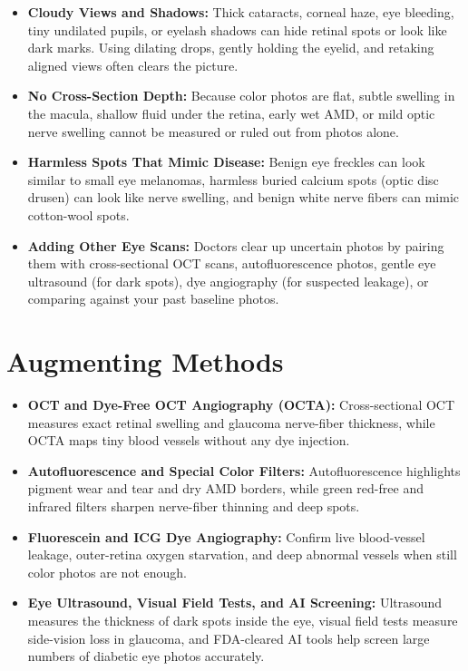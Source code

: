 \begin{itemize}
    \item \textbf{Cloudy Views and Shadows:} Thick cataracts, corneal haze, eye bleeding, tiny undilated pupils, or eyelash shadows can hide retinal spots or look like dark marks. Using dilating drops, gently holding the eyelid, and retaking aligned views often clears the picture.
    \item \textbf{No Cross-Section Depth:} Because color photos are flat, subtle swelling in the macula, shallow fluid under the retina, early wet AMD, or mild optic nerve swelling cannot be measured or ruled out from photos alone.
    \item \textbf{Harmless Spots That Mimic Disease:} Benign eye freckles can look similar to small eye melanomas, harmless buried calcium spots (optic disc drusen) can look like nerve swelling, and benign white nerve fibers can mimic cotton-wool spots.
    \item \textbf{Adding Other Eye Scans:} Doctors clear up uncertain photos by pairing them with cross-sectional OCT scans, autofluorescence photos, gentle eye ultrasound (for dark spots), dye angiography (for suspected leakage), or comparing against your past baseline photos.
\end{itemize}

\section{Augmenting Methods}

\begin{itemize}
    \item \textbf{OCT and Dye-Free OCT Angiography (OCTA):} Cross-sectional OCT measures exact retinal swelling and glaucoma nerve-fiber thickness, while OCTA maps tiny blood vessels without any dye injection.
    \item \textbf{Autofluorescence and Special Color Filters:} Autofluorescence highlights pigment wear and tear and dry AMD borders, while green red-free and infrared filters sharpen nerve-fiber thinning and deep spots.
    \item \textbf{Fluorescein and ICG Dye Angiography:} Confirm live blood-vessel leakage, outer-retina oxygen starvation, and deep abnormal vessels when still color photos are not enough.
    \item \textbf{Eye Ultrasound, Visual Field Tests, and AI Screening:} Ultrasound measures the thickness of dark spots inside the eye, visual field tests measure side-vision loss in glaucoma, and FDA-cleared AI tools help screen large numbers of diabetic eye photos accurately.
\end{itemize}

